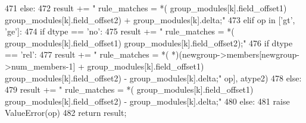 \begin{DoxyCode}
471         else:
472             result += "    rule_matches = *(%
       group_modules[k].field_offset1) %
       group_modules[k].field_offset2) + group_modules[k].delta;\n"%
473     elif op in ['gt', 'ge']:
474         if dtype == 'no':
475             result += "    rule_matches = *(%
       group_modules[k].field_offset1) %
       group_modules[k].field_offset2);\n"%
476         if dtype == 'rel':
477             result += "    rule_matches = *(%
       *)(newgroup->members[newgroup->num_members-1] + group_modules[k].field_offset1) %
       group_modules[k].field_offset2) - group_modules[k].delta;\n"%
      op], atype2)
478         else:
479             result += "    rule_matches = *(%
       group_modules[k].field_offset1) %
       group_modules[k].field_offset2) - group_modules[k].delta;\n"%
480     else:
481         raise ValueError(op)
482     return result;

\end{DoxyCode}


